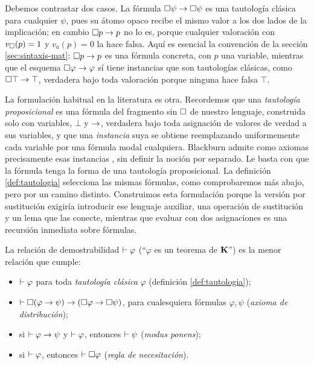 Debemos contrastar dos casos. La fórmula $\square\psi \to \square\psi$ es una tautología clásica para cualquier $\psi$, pues su átomo opaco recibe el mismo valor a los dos lados de la implicación; en cambio $\square p \to p$ no lo es, porque cualquier valoración con $v_\square(p) = 1$ y $v_a(p) = 0$ la hace falsa. Aquí es esencial la convención de la sección \ref{sec:sintaxis-mat}: $\square p \to p$ es una fórmula concreta, con $p$ una variable, mientras que el esquema $\square\varphi \to \varphi$ sí tiene instancias que son tautologías clásicas, como $\square\top \to \top$, verdadera bajo toda valoración porque ninguna hace falsa $\top$.

La formulación habitual en la literatura es otra. Recordemos que una \emph{tautología proposicional} es una fórmula del fragmento sin $\square$ de nuestro lenguaje, construida solo con variables, $\bot$ y $\to$, verdadera bajo toda asignación de valores de verdad a sus variables, y que una \emph{instancia} suya se obtiene reemplazando uniformemente cada variable por una fórmula modal cualquiera. Blackburn admite como axiomas precisamente esas instancias \cite[Def.~1.39]{blackburn}, sin definir la noción por separado. Le basta con que la fórmula tenga la forma de una tautología proposicional. La definición \ref{def:tautologia} selecciona las mismas fórmulas, como comprobaremos más abajo, pero por un camino distinto. Construimos esta formulación porque la versión por sustitución exigiría introducir ese lenguaje auxiliar, una operación de sustitución y un lema que las conecte, mientras que evaluar con dos asignaciones es una recursión inmediata sobre fórmulas.

\begin{definicion}[El sistema $\K$]\label{def:sistemaK}
La relación de demostrabilidad $\vdash \varphi$ (``$\varphi$ es un teorema de $\K$'') es la menor relación que cumple:
\begin{itemize}
    \item[\textup{(CPL)}] $\vdash \varphi$ para toda \emph{tautología clásica} $\varphi$ (definición \ref{def:tautologia});
  \item[\textup{(K)}] $\vdash \square(\varphi \to \psi) \to (\square\varphi \to \square\psi)$, para cualesquiera fórmulas $\varphi, \psi$ (\emph{axioma de distribución});
  \item[\textup{(MP)}] si $\vdash \varphi \to \psi$ y $\vdash \varphi$, entonces $\vdash \psi$ (\emph{modus ponens});
  \item[\textup{(N)}] si $\vdash \varphi$, entonces $\vdash \square\varphi$ (\emph{regla de necesitación}).
\end{itemize}
\end{definicion}

